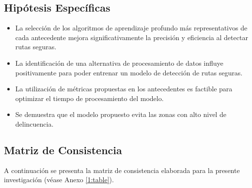 \subsection{Hipótesis Específicas}
\newcommand{\Hone}{
La selección de los algoritmos de aprendizaje profundo más representativos de cada antecedente mejora significativamente la precisión y eficiencia al detectar rutas seguras.
}
\newcommand{\Htwo}{
La identificación de una alternativa de procesamiento de datos influye positivamente para poder entrenar un modelo de detección de rutas seguras.
}
\newcommand{\Hthree}{
La utilización de métricas propuestas en los antecedentes es factible para optimizar el tiempo de procesamiento del modelo.	
}
\newcommand{\Hfour}{
Se demuestra que el modelo propuesto evita las zonas con alto nivel de delincuencia.
}
\begin{itemize}
	\item \Hone
	\item \Htwo
	\item \Hthree
	\item \Hfour
\end{itemize}

\subsection{Matriz de Consistencia}
A continuación se presenta la matriz de consistencia elaborada para la presente investigación (véase Anexo \ref{1:table}).


